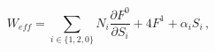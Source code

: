 \begin{equation}\label{Weff}
W_{eff} = \sum_{i\in\{1,2,0\}} N_i \frac{\partial F^0}{\partial S_i} + 4 F^1 + \alpha_i S_i\,,
\end{equation}

